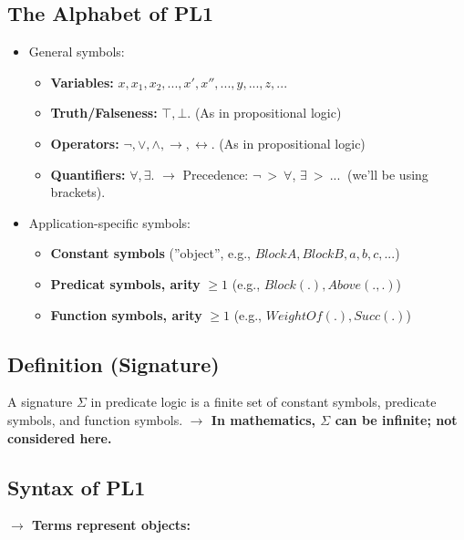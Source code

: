 \documentclass[conference, a4paper]{styles/acmsiggraph}
\begin{document}
    \subsection{The Alphabet of PL1}
        \begin{itemize}
            \item General symbols:
                \begin{itemize}
                    \item \textbf{Variables:} $x,x_1,x_2,...,x',x'',...,y,...,z,...$
                    \item \textbf{Truth/Falseness:} $\top,\bot$. (As in propositional logic)
                    \item \textbf{Operators:} $\lnot,\vee,\wedge,\rightarrow,\leftrightarrow$. (As in propositional logic)
                    \item \textbf{Quantifiers:} $\forall,\exists$.\newline
                        $\rightarrow$ Precedence: $\lnot \  > \  \forall$, $\exists \  > \  ... \ $ (we'll be using brackets).
                \end{itemize}
            \item Application-specific symbols:
                \begin{itemize}
                    \item \textbf{Constant symbols} (''object'', e.g., $BlockA,BlockB,a,b,c,...$)
                    \item \textbf{Predicat symbols, arity} $\geq 1$ (e.g., $Block(.),Above(.,.)$)
                    \item \textbf{Function symbols, arity} $\geq 1$ (e.g., $WeightOf(.),Succ(.)$)
                \end{itemize}
        \end{itemize}
    
    
    \subsection{Definition (Signature)}
        A signature $\Sigma$ in predicate logic is a finite set of constant symbols, predicate symbols, and function symbols.\newline
        \textbf{$\rightarrow$ In mathematics, $\Sigma$ can be infinite; not considered here.}
    
    
    \subsection{Syntax of PL1}
        \textbf{$\rightarrow$ Terms represent objects:}
\end{document}
